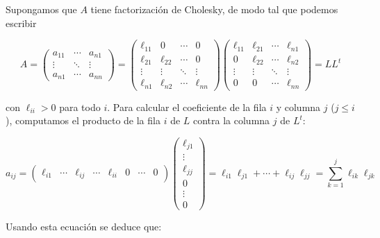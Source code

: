 Supongamos que $A$ tiene factorización de Cholesky, de modo tal que podemos escribir

\[
A = \begin{pmatrix}
a_{11} & \cdots & a_{n1} \\
\vdots & \ddots & \vdots \\
a_{n1} & \cdots & a_{nn}
\end{pmatrix} = 
\begin{pmatrix}
\ell_{11} & 0 & \cdots & 0 \\
\ell_{21} & \ell_{22} & \cdots & 0 \\
\vdots & \vdots & \ddots & \vdots \\
\ell_{n1} & \ell_{n2} & \cdots & \ell_{nn}
\end{pmatrix}
\begin{pmatrix}
\ell_{11} 	& \ell_{21}	& \cdots & \ell_{n1} \\
0		 	& \ell_{22} 	& \cdots & \ell_{n2} \\
\vdots 		& \vdots 	& \ddots & \vdots \\
0		 	& 0			& \cdots & \ell_{nn}
\end{pmatrix} = LL^t
\]

con $\ell_{ii} > 0$ para todo $i$. Para calcular el coeficiente de la fila $i$ y columna $j$ ($j \leq i$), computamos el producto de la fila $i$ de $L$ contra la columna $j$ de $L^t$:

\[a_{ij} = \begin{pmatrix}
\ell_{i1} & \cdots & \ell_{ij} & \cdots & \ell_{ii} & 0 & \cdots & 0
\end{pmatrix}
\begin{pmatrix}
\ell_{j1} \\
\vdots \\
\ell_{jj} \\
0 \\
\vdots \\
0
\end{pmatrix} = \ell_{i1}\ell_{j1} + \cdots + \ell_{ij}\ell_{jj} = \sum_{k = 1}^j \ell_{ik}\ell_{jk}\]

Usando esta ecuación se deduce que:


